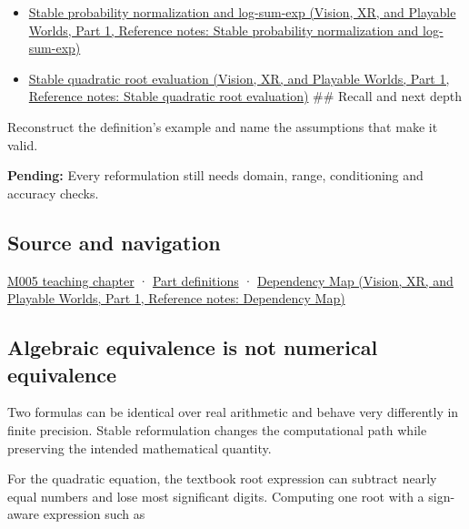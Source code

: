 \begin{itemize}
\tightlist
\item
  \href{../07-Vision-XR-and-Playable-Worlds-P01/main.pdf\#appendix-d580b422240f}{Stable probability normalization and log-sum-exp (Vision, XR, and Playable Worlds, Part 1, Reference notes: Stable probability normalization and log-sum-exp)}
\item
  \href{../07-Vision-XR-and-Playable-Worlds-P01/main.pdf\#appendix-b9afba7f63e5}{Stable quadratic root evaluation (Vision, XR, and Playable Worlds, Part 1, Reference notes: Stable quadratic root evaluation)} \#\# Recall and next depth
\end{itemize}

Reconstruct the definition's example and name the assumptions that make it valid.

\textbf{Pending:} Every reformulation still needs domain, range, conditioning and accuracy checks.

\subsection{Source and navigation}\label{appendix-d7f8ba961670-source-and-navigation}

\hypertarget{appendix-d7f8ba961670-source-and-navigation}{}

\hyperref[01-foundations-i-ch001-when-arithmetic-meets-uncertainty]{M005 teaching chapter} · \hyperref[appendix-fd090d982a15-m005---parts-77-88]{Part definitions} · \href{../07-Vision-XR-and-Playable-Worlds-P01/main.pdf\#appendix-4ad47bdd269a}{Dependency Map (Vision, XR, and Playable Worlds, Part 1, Reference notes: Dependency Map)}

\subsection{Algebraic equivalence is not numerical equivalence}\label{appendix-d7f8ba961670-algebraic-equivalence-is-not-numerical-equivalence}

\hypertarget{appendix-d7f8ba961670-algebraic-equivalence-is-not-numerical-equivalence}{}

Two formulas can be identical over real arithmetic and behave very differently in finite precision. Stable reformulation changes the computational path while preserving the intended mathematical quantity.

For the quadratic equation, the textbook root expression can subtract nearly equal numbers and lose most significant digits. Computing one root with a sign-aware expression such as

